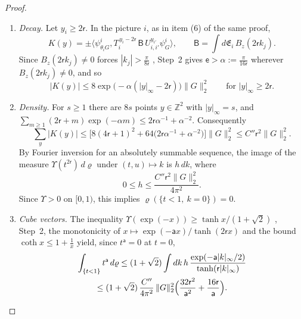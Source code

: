 \documentclass[11pt,letterpaper,reqno]{amsart}
\theoremstyle{definition}
\begin{document}
\begin{proof}
\begin{enumerate}
\begin{equation*}
K(y)=\int d\varrho\,\Upsilon(t^{2\mathsf r})\,u^y,\qquad K(-y)=\overline{K(y)},\qquad|K|\le8\|G\|_2^2.
\end{equation*}
\item[4.] \emph{Decay.}
Let $y_i\ge2\mathsf r$.
In the picture $i$, as in item (6) of the same proof,
\begin{equation*}
K(y)=\pm\bigl\langle\psi^i_{\theta_iG},T_i^{\,y_i-2\mathsf r}\,\mathsf B\,U_{i,i'}^{y_{i'}}\psi^i_G\bigr\rangle,\qquad\mathsf B=\int d\mathfrak E_i\,B_z(2\mathsf rk_j).
\end{equation*}
Since $B_z(2\mathsf rk_j)\ne0$ forces $|k_j|>\frac{\pi}{8\mathsf r}$ \cite[Lemma~12.35]{QEDII}, Step~2 gives $\mathsf e>\alpha:=\frac{\pi}{16\mathsf r}$ wherever $B_z(2\mathsf rk_j)\ne0$, and so
\begin{equation*}
|K(y)|\le8\exp\bigl(-\alpha(|y|_\infty-2\mathsf r)\bigr)\|G\|_2^2\qquad\text{for }|y|_\infty\ge2\mathsf r.
\end{equation*}
\item[5.] \emph{Density.}
For $s\ge1$ there are $8s$ points $y\in\mathbb Z^2$ with $|y|_\infty=s$, and $\sum_{m\ge1}(2\mathsf r+m)\exp(-\alpha m)\le2\mathsf r\alpha^{-1}+\alpha^{-2}$.
Consequently
\begin{equation*}
\sum_y|K(y)|\le\bigl[8(4\mathsf r+1)^2+64\bigl(2\mathsf r\alpha^{-1}+\alpha^{-2}\bigr)\bigr]\|G\|_2^2\le C''\mathsf r^2\|G\|_2^2.
\end{equation*}
By Fourier inversion for an absolutely summable sequence, the image of the measure $\Upsilon(t^{2\mathsf r})\,d\varrho$ under $(t,u)\mapsto k$ is $h\,dk$, where
\begin{equation*}
0\le h\le\frac{C''\mathsf r^2\|G\|_2^2}{4\pi^2}.
\end{equation*}
Since $\Upsilon>0$ on $[0,1)$, this implies $\varrho(\{t<1,\ k=0\})=0$.
\item[6.] \emph{Cube vectors.}
The inequality $\Upsilon(\exp(-x))\ge\tanh x/(1+\sqrt2)$ \cite[Lemma~12.35]{QEDII}, Step~2, the monotonicity of $x\mapsto\exp(-\mathsf ax)/\tanh(2\mathsf rx)$ and the bound $\coth x\le1+\frac1x$ yield, since $t^{\mathsf a}=0$ at $t=0$,
\begin{multline*}
\int_{\{t<1\}}t^{\mathsf a}\,d\varrho\le(1+\sqrt2)\int dk\,h\,\frac{\exp(-\mathsf a|k|_\infty/2)}{\tanh(\mathsf r|k|_\infty)}\\
\le(1+\sqrt2)\,\frac{C''}{4\pi^2}\,\|G\|_2^2\Bigl(\frac{32\mathsf r^2}{\mathsf a^2}+\frac{16\mathsf r}{\mathsf a}\Bigr).
\end{multline*}

\end{enumerate}
\end{proof}
\end{document}
